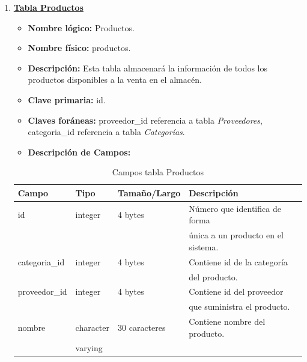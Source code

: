 \documentclass[letterpaper,12pt]{article}
\begin{document}
\begin{enumerate}
\item \textbf{\underline{Tabla Productos}}
\begin{itemize}
\item \textbf{Nombre lógico:} Productos.
\item \textbf{Nombre físico:} productos.
\item \textbf{Descripción:} Esta tabla almacenará la información de todos los productos disponibles a la venta en el almacén.
\item \textbf{Clave primaria:} id.
\item \textbf{Claves foráneas:} proveedor\_id referencia a tabla \emph{Proveedores}, categoria\_id referencia a tabla \emph{Categorías}.
\item\textbf{Descripción de Campos:}
\end{itemize}

\begin{table}[!ht]
\caption{Campos tabla Productos}
\begin{center}
\begin{tabular}{|l|l|l|l|}
\hline
\textbf{Campo} \hspace*{2cm} & \textbf{Tipo} & \textbf{Tamaño/Largo} & \textbf{Descripción} \hspace*{3,5cm} \\
\hline
id & integer & 4 bytes&Número que identifica de forma\\ 
\mbox{} & \mbox{} & &única a un producto en el sistema.\\
\hline

categoria\_id & integer & 4 bytes&Contiene id de la categoría\\
\mbox{} & \mbox{} & &del producto.\\
\hline

proveedor\_id & integer & 4 bytes&Contiene id del proveedor\\
\mbox{} & \mbox{} & &que suministra el producto.\\
\hline

nombre & character & 30 caracteres&Contiene nombre del producto.\\
& varying & & \\
\hline

\end{tabular}
\end{center}
\end{table}

\newpage


\end{enumerate}
\end{document}
